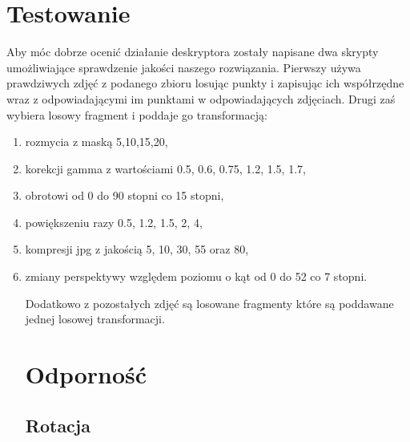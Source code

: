 \documentclass[a4paper,11pt]{article}
\begin{document}
\section{Testowanie}
Aby móc dobrze ocenić działanie deskryptora zostały napisane dwa skrypty umożliwiające sprawdzenie jakości naszego rozwiązania. Pierwszy używa prawdziwych zdjęć z podanego zbioru losując punkty i zapisując ich współrzędne wraz z odpowiadającymi im punktami w odpowiadających zdjęciach. Drugi zaś wybiera losowy fragment i poddaje go transformacją:
\begin{enumerate}
\item rozmycia z maską 5,10,15,20,
\item korekcji gamma z wartościami 0.5, 0.6, 0.75, 1.2, 1.5, 1.7,
\item obrotowi od 0 do 90 stopni co 15 stopni,
\item powiększeniu razy 0.5, 1.2, 1.5, 2, 4,
\item kompresji jpg z jakością 5, 10, 30, 55 oraz 80,
\item zmiany perspektywy względem poziomu o kąt od 0 do 52 co 7 stopni.


Dodatkowo z pozostałych zdjęć są losowane fragmenty które są poddawane jednej losowej transformacji.

\section{Odporność}
\subsection{Rotacja}
\begin{table}[htb]
\centering
\begin{tabular}{|r|l|l|l|l|l|l|l|l|l|}


\end{tabular}
\end{table}
\end{enumerate}
\end{document}
